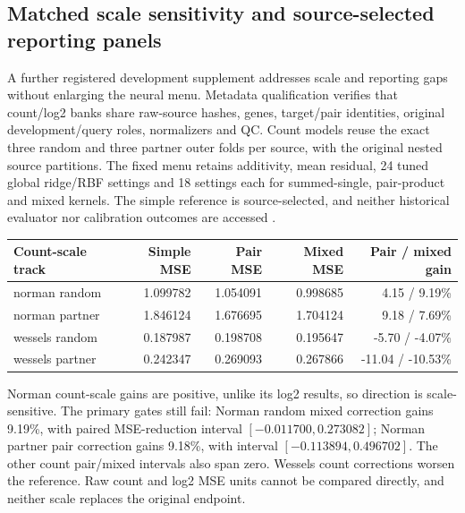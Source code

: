 \subsection{Matched scale sensitivity and source-selected reporting panels}

A further registered development supplement addresses scale and reporting gaps without enlarging the neural menu. Metadata qualification verifies that count/log2 banks share raw-source hashes, genes, target/pair identities, original development/query roles, normalizers and QC. Count models reuse the exact three random and three partner outer folds per source, with the original nested source partitions. The fixed menu retains additivity, mean residual, 24 tuned global ridge/RBF settings and 18 settings each for summed-single, pair-product and mixed kernels. The simple reference is source-selected, and neither historical evaluator nor calibration outcomes are accessed \citep{opalpanel2026}.

\begin{center}\small\begin{tabular}{lrrrr}\toprule

Count-scale track & Simple MSE & Pair MSE & Mixed MSE & Pair / mixed gain\\\midrule

norman random & 1.099782 & 1.054091 & 0.998685 & 4.15 / 9.19\%\\

norman partner & 1.846124 & 1.676695 & 1.704124 & 9.18 / 7.69\%\\

wessels random & 0.187987 & 0.198708 & 0.195647 & -5.70 / -4.07\%\\

wessels partner & 0.242347 & 0.269093 & 0.267866 & -11.04 / -10.53\%\\

\bottomrule\end{tabular}\end{center}

Norman count-scale gains are positive, unlike its log2 results, so direction is scale-sensitive. The primary gates still fail: Norman random mixed correction gains 9.19\%, with paired MSE-reduction interval $[-0.011700,0.273082]$; Norman partner pair correction gains 9.18\%, with interval $[-0.113894,0.496702]$. The other count pair/mixed intervals also span zero. Wessels count corrections worsen the reference. Raw count and log2 MSE units cannot be compared directly, and neither scale replaces the original endpoint.

